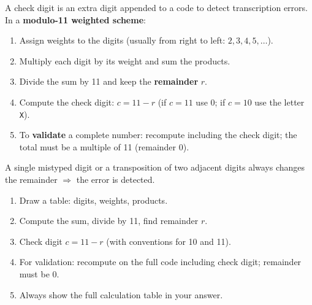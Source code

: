 \documentclass[11pt]{article}
\newcommand{\cle}[1]{{\popxbold\color{popdark}#1}}
\begin{document}
\begin{propriete}
A \cle{check digit} is an extra digit appended to a code to detect transcription errors. In a \textbf{modulo-11 weighted scheme}:
\begin{enumerate}
\item Assign weights to the digits (usually from right to left: $2, 3, 4, 5, \ldots$).
\item Multiply each digit by its weight and sum the products.
\item Divide the sum by 11 and keep the \textbf{remainder} $r$.
\item Compute the check digit: $c = 11 - r$ (if $c = 11$ use $0$; if $c = 10$ use the letter \texttt{X}).
\item To \textbf{validate} a complete number: recompute including the check digit; the total must be a multiple of 11 (remainder $0$).
\end{enumerate}
A single mistyped digit or a transposition of two adjacent digits always changes the remainder $\Rightarrow$ the error is detected.
\end{propriete}

\begin{methode}
\begin{enumerate}
\item Draw a table: digits, weights, products.
\item Compute the sum, divide by 11, find remainder $r$.
\item Check digit $c = 11 - r$ (with conventions for 10 and 11).
\item For validation: recompute on the full code including check digit; remainder must be 0.
\item Always show the full calculation table in your answer.
\end{enumerate}
\end{methode}
\end{document}
